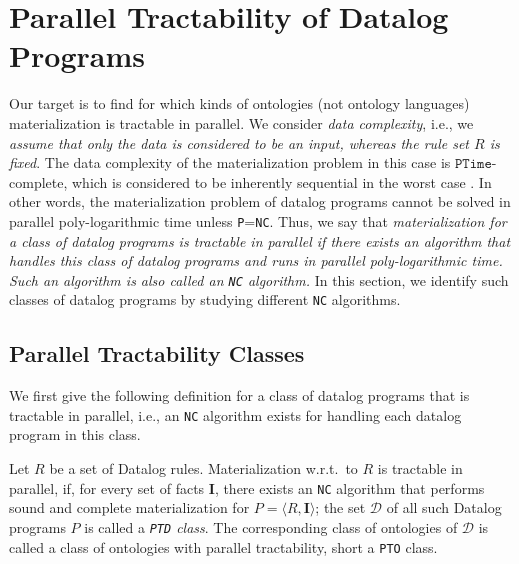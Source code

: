 \section{Parallel Tractability of Datalog Programs}
\label{sec:ptclass}

Our target is to find for which kinds of ontologies (not ontology
languages) materialization is tractable in parallel. We consider
\emph{data complexity}, i.e., we \emph{assume that only the data is
  considered to be an input, whereas the rule set $R$ is fixed}.
  The data complexity of the materialization problem in this case
is $\texttt{PTime}$-complete, which is considered to be inherently
sequential in the worst case \cite{Raymond95}.
In other words, the materialization problem of
datalog programs cannot be solved in parallel poly-logarithmic time unless \texttt{P}=\texttt{NC}.
Thus, we say that \emph{materialization for a class of datalog programs is tractable in parallel
if there exists an algorithm that handles this class of datalog programs and runs in parallel
poly-logarithmic time. Such an algorithm is also called an \texttt{NC} algorithm.}
In this section, we identify such classes of datalog programs by studying different \texttt{NC} algorithms.


\subsection{Parallel Tractability Classes}

We first give the following definition for a class of datalog programs
that is tractable in parallel, i.e., an \texttt{NC} algorithm exists
for handling each datalog program in this class.

\begin{definition}\label{def:ptd}

  Let $R$ be a set of Datalog rules. Materialization w.r.t.\ to $R$ is
  tractable in parallel, if, for every set of facts $\textbf{I}$,
  there exists an \texttt{NC} algorithm that performs sound and
  complete materialization for $P=\langle R, \textbf{I}\rangle$; the
  set $\mathcal{D}$ of all such Datalog programs $P$ is called a
  \emph{\texttt{PTD} class}.  The corresponding class of ontologies of
  $\mathcal{D}$ is called a class of ontologies with parallel
  tractability, short a \texttt{PTO} class.
\end{definition}

